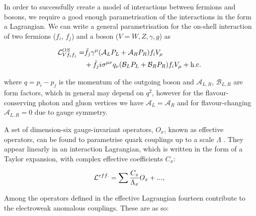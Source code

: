 In order to successfully create a model of interactions between fermions and bosons, we require a good enough parametrisation of the interactions in the form a Lagrangian. We can write a general parametrisation for the on-shell interaction of two fermions ($f_i$, $f_j$) and a boson ($V = W,Z,\gamma,g$) as

\begin{equation}
\begin{split}
\mathcal{L}^{OS}_{Vf_if_j} = & \bar{f}_j\gamma^{\mu} (\mathcal{A}_L P_L + \mathcal{A}_R P_R)f_i V_{\mu} \\
& + \bar{f}_j i \sigma^{\mu \nu} q_{\nu}(\mathcal{B}_L P_L + \mathcal{B}_R P_R) f_i V_{\mu} + \text{h.c.}
\end{split}
\end{equation}

where $q = p_i - p_j$ is the momentum of the outgoing boson and $\mathcal{A}_{L,R}$, $\mathcal{B}_{L,R}$ are form factors, which in general may depend on $q^2$, however for the flavour-conserving photon and gluon vertices we have $\mathcal{A}_L = \mathcal{A}_R$ and for flavour-changing $\mathcal{A}_{L,R} = 0$ due to gauge symmetry. 

A set of dimension-six gauge-invariant operators, $O_x$, known as effective operators, can be found to parametrise quark couplings up to a scale $\Lambda$ \cite{anom-coups}. They appear linearly in an interaction Lagrangian, which is written in the form of a Taylor expansion, with complex effective coefficients $C_x$:

\begin{equation} \label{eqn-EffectiveOperators}
\mathcal{L}^{eff.} = \sum \frac{C_x}{\Lambda_x}O_x + ... ,
\end{equation}

Among the operators defined in the effective Lagrangian \cite{Buchmuller:1985jz} fourteen contribute to the electroweak anomalous couplings. These are as so:

